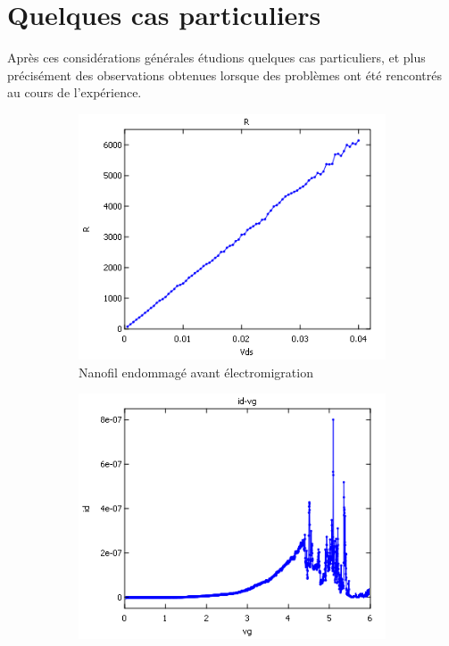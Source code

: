 \section{Quelques cas particuliers}
Après ces considérations générales étudions quelques cas particuliers, et plus précisément des observations obtenues lorsque des problèmes ont été rencontrés au cours de l’expérience.
\begin{figure}[h]
    \centering
    \begin{subfigure}[b]{0.28\textwidth}
        \includegraphics[width=\textwidth]{Images/Nanofil_Emdommage.png}
        \caption{Nanofil endommagé avant électromigration}
    \end{subfigure}%
    \quad %
    \begin{subfigure}[b]{0.28\textwidth}
        \includegraphics[width=\textwidth]{Images/Grille_Endommagee}

\end{subfigure}
\end{figure}
